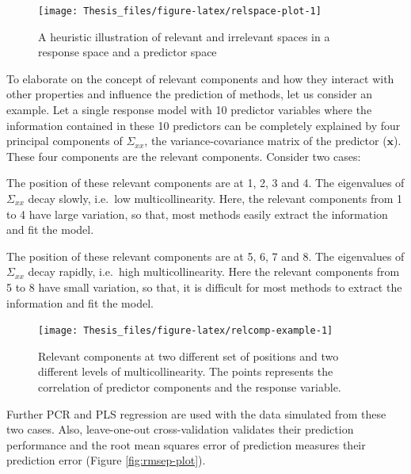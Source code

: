 \documentclass[11pt,twoside,openright,titlepage,
  headinclude,footinclude,BCOR=5mm,
  numbers=noenddot,cleardoublepage=empty,
  tablecaptionabove, dottedtoc,
  bibliography=totoc,paper=a4]{scrreprt}
\providecommand{\tightlist}{%
  \setlength{\itemsep}{0pt}\setlength{\parskip}{0pt}}
\begin{document}
\begin{figure}[!htb]
\texttt{[image: Thesis\_files/figure-latex/relspace-plot-1]} \caption[A heuristic illustration of relevant and irrelevant spaces]{A heuristic illustration of relevant and irrelevant spaces in a response space and a predictor space}\label{fig:relspace-plot}
\end{figure}

To elaborate on the concept of relevant components and how they interact with other properties and influence the prediction of methods, let us consider an example. Let a single response model with 10 predictor variables where the information contained in these 10 predictors can be completely explained by four principal components of \(\Sigma_{xx}\), the variance-covariance matrix of the predictor (\(\mathbf{x}\)). These four components are the relevant components. Consider two cases:

\begin{description}
\tightlist
\item[Case 1 (Figure \ref{fig:relcomp-example}, left):]
The position of these relevant components are at 1, 2, 3 and 4. The eigenvalues of \(\Sigma_{xx}\) decay slowly, i.e.~low multicollinearity. Here, the relevant components from 1 to 4 have large variation, so that, most methods easily extract the information and fit the model.
\item[Case 2 (Figure \ref{fig:relcomp-example}, right):]
The position of these relevant components are at 5, 6, 7 and 8. The eigenvalues of \(\Sigma_{xx}\) decay rapidly, i.e.~high multicollinearity. Here the relevant components from 5 to 8 have small variation, so that, it is difficult for most methods to extract the information and fit the model.
\end{description}

\begin{figure}[!htb]
\texttt{[image: Thesis\_files/figure-latex/relcomp-example-1]} \caption[Relevant Components and Multicollinearity]{Relevant components at two different set of positions and two different levels of multicollinearity. The points represents the correlation of predictor components and the response variable.}\label{fig:relcomp-example}
\end{figure}

Further PCR and PLS regression are used with the data simulated from these two cases. Also, leave-one-out cross-validation validates their prediction performance and the root mean squares error of prediction measures their prediction error (Figure \ref{fig:rmsep-plot}).
\end{document}
